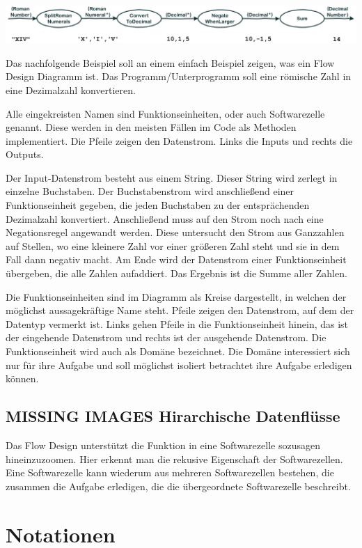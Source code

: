 \documentclass[11pt]{article}
\begin{document}
\includegraphics[width=.9\linewidth]{./img/FromRomanNumerals.png}

Das nachfolgende Beispiel soll an einem einfach Beispiel zeigen, was ein Flow Design Diagramm ist.
Das Programm/Unterprogramm soll eine römische Zahl in eine Dezimalzahl konvertieren.

Alle eingekreisten Namen sind Funktionseinheiten, oder auch Softwarezelle genannt.
Diese werden in den meisten Fällen im Code als Methoden implementiert.
Die Pfeile zeigen den Datenstrom. Links die Inputs und rechts die Outputs.


Der Input-Datenstrom besteht aus einem String. Dieser String wird zerlegt in einzelne Buchstaben.
Der Buchstabenstrom wird anschließend einer Funktionseinheit gegeben, die jeden Buchstaben zu der entsprächenden 
Dezimalzahl konvertiert. Anschließend muss auf den Strom noch nach eine Negationsregel angewandt werden. Diese untersucht den
Strom aus Ganzzahlen auf Stellen, wo eine kleinere Zahl vor einer größeren Zahl steht und sie in dem Fall dann negativ macht.
Am Ende wird der Datenstrom einer Funktionseinheit übergeben, die alle Zahlen aufaddiert.
Das Ergebnis ist die Summe aller Zahlen. 

Die Funktionseinheiten sind im Diagramm als Kreise dargestellt, in welchen der möglichst aussagekräftige Name steht.
Pfeile zeigen den Datenstrom, auf dem der Datentyp vermerkt ist.
Links gehen Pfeile in die Funktionseinheit hinein, das ist der eingehende Datenstrom und rechts ist der ausgehende Datenstrom.
Die Funktionseinheit wird auch als Domäne bezeichnet. Die Domäne interessiert sich nur für ihre Aufgabe und soll möglichst isoliert
betrachtet ihre Aufgabe erledigen können.
\subsection{{\bfseries\sffamily MISSING IMAGES} Hirarchische Datenflüsse}
\label{sec:orgheadline12}
Das Flow Design unterstützt die Funktion in eine Softwarezelle sozusagen hineinzuzoomen.
Hier erkennt man die rekusive Eigenschaft der Softwarezellen. Eine Softwarezelle kann wiederum aus mehreren Softwarezellen bestehen,
die zusammen die Aufgabe erledigen, die die übergeordnete Softwarezelle beschreibt.


\section{Notationen}
\label{sec:orgheadline27}
\end{document}
